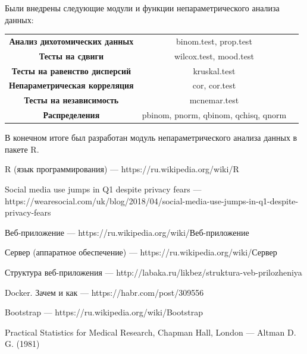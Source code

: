 \documentclass[14pt,a4paper]{scrartcl}
\begin{document}
    Были внедрены следующие модули и функции непараметрического анализа данных:

    \begin{center}
        \begin{tabular}{ccc}
            \textbf{Анализ дихотомических данных} & binom.test, prop.test\\
            \textbf{Тесты на сдвиги} & wilcox.test, mood.test\\
            \textbf{Тесты на равенство дисперсий} & kruskal.test\\
            \textbf{Непараметрическая корреляция} & cor, cor.test\\
            \textbf{Тесты на независимость} & mcnemar.test\\
            \textbf{Распределения} & pbinom, pnorm, qbinom, qchisq, qnorm\\
        \end{tabular}
    \end{center}

    В конечном итоге был разработан модуль непараметрического анализа данных в пакете R.

    \newpage
    \begin{thebibliography}{9}
        R (язык программирования)
        \newblock --- https://ru.wikipedia.org/wiki/R

        Social media use jumps in Q1 despite privacy fears
        \newblock --- https://wearesocial.com/uk/blog/2018/04/social-media-use-jumps-in-q1-despite-privacy-fears

        Веб-приложение
        \newblock --- https://ru.wikipedia.org/wiki/Веб-приложение

        Сервер (аппаратное обеспечение)
        \newblock --- https://ru.wikipedia.org/wiki/Сервер

        Структура веб-приложения
        \newblock --- http://labaka.ru/likbez/struktura-veb-prilozheniya

        Docker. Зачем и как
        \newblock --- https://habr.com/post/309556

        Bootstrap
        \newblock --- https://ru.wikipedia.org/wiki/Bootstrap

        Practical Statistics for Medical Research, Chapman Hall, London
        \newblock --- Altman D. G. (1981)

    \end{thebibliography}
\end{document}
